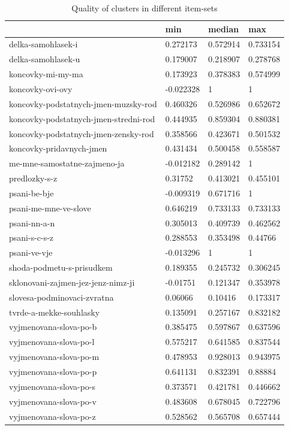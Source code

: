 \documentclass[
  digital, %
  table,   %
  nolof,     %
  nolot,     %
  nocover
]{fithesis3}
\begin{document}
\begin{table}
  \begin{tabular}{ | l | l | l | l | }
    \hline
  	 & min & median & max \\ \hline
  	delka-samohlasek-i & 0.272173 & 0.572914 & 0.733154 \\ \hline
  	delka-samohlasek-u & 0.179007 & 0.218907 & 0.278768 \\ \hline
  	koncovky-mi-my-ma & 0.173923 & 0.378383 & 0.574999 \\ \hline
  	koncovky-ovi-ovy & -0.022328 & 1 & 1 \\ \hline
  	koncovky-podstatnych-jmen-muzsky-rod & 0.460326 & 0.526986 & 0.652672 \\ \hline
  	koncovky-podstatnych-jmen-stredni-rod & 0.444935 & 0.859304 & 0.880381 \\ \hline
  	koncovky-podstatnych-jmen-zensky-rod & 0.358566 & 0.423671 & 0.501532 \\ \hline
  	koncovky-pridavnych-jmen & 0.431434 & 0.500458 & 0.558587 \\ \hline
  	me-mne-samostatne-zajmeno-ja & -0.012182 & 0.289142 & 1 \\ \hline
  	predlozky-s-z & 0.31752 & 0.413021 & 0.455101 \\ \hline
  	psani-be-bje & -0.009319 & 0.671716 & 1 \\ \hline
  	psani-me-mne-ve-slove & 0.646219 & 0.733133 & 0.733133 \\ \hline
  	psani-nn-a-n & 0.305013 & 0.409739 & 0.462562 \\ \hline
  	psani-s-c-s-z & 0.288553 & 0.353498 & 0.44766 \\ \hline
  	psani-ve-vje & -0.013296 & 1 & 1 \\ \hline
  	shoda-podmetu-s-prisudkem & 0.189355 & 0.245732 & 0.306245 \\ \hline
  	sklonovani-zajmen-jez-jenz-nimz-ji & -0.01751 & 0.121347 & 0.353978 \\ \hline
  	slovesa-podminovaci-zvratna & 0.06066 & 0.10416 & 0.173317 \\ \hline
  	tvrde-a-mekke-souhlasky & 0.135091 & 0.257167 & 0.832182 \\ \hline
  	vyjmenovana-slova-po-b & 0.385475 & 0.597867 & 0.637596 \\ \hline
  	vyjmenovana-slova-po-l & 0.575217 & 0.641585 & 0.837544 \\ \hline
  	vyjmenovana-slova-po-m & 0.478953 & 0.928013 & 0.943975 \\ \hline
  	vyjmenovana-slova-po-p & 0.641131 & 0.832391 & 0.88884 \\ \hline
  	vyjmenovana-slova-po-s & 0.373571 & 0.421781 & 0.446662 \\ \hline
  	vyjmenovana-slova-po-v & 0.483608 & 0.678045 & 0.722796 \\ \hline
  	vyjmenovana-slova-po-z & 0.528562 & 0.565708 & 0.657444 \\ \hline
  \end{tabular}
  \caption{Quality of clusters in different item-sets}
  \label{tab:quality-of-clusters}
\end{table}
\end{document}
